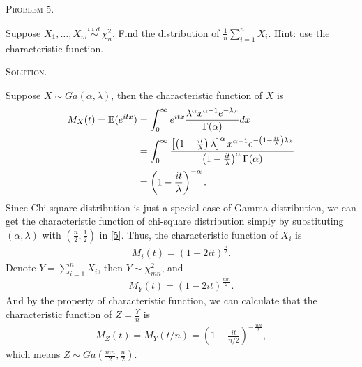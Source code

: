 \documentclass{article}
\begin{document}
\begin{CJK}{UTF8}{gbsn}
    \begin{shaded}
        \noindent\textsc{Problem 5.}\par
        Suppose $X_1,\ldots,X_m \mathop{\sim}\limits^{i.i.d.} \chi_n^2$. Find the distribution of $\frac{1}{n}\sum_{i=1}^nX_i $. Hint: use
        the characteristic function.
    \end{shaded}
    \noindent\textsc{Solution.}\par
    Suppose $X\sim Ga(\alpha, \lambda)$, then the characteristic function of $X$ is
    \begin{align}
        M_X(t) = \mathbb{E}(e^{itx}) & = \int_0^{\infty} e^{itx}\frac{\lambda^{\alpha}x^{\alpha -1}e^{-\lambda x}}{\Gamma(\alpha)}dx\notag                                                                                                                           \\
                                     & = \int_0^{\infty} \frac{\left [ \left (1-\frac{it}{\lambda}\right )\lambda\right ]^{\alpha}x^{\alpha -1}e^{-\left (1-\frac{it}{\lambda}\right )\lambda x}}{\left (1-\frac{it}{\lambda}\right )^{\alpha}\Gamma(\alpha)} \notag \\
                                     & = \left (1-\frac{it}{\lambda}\right )^{-\alpha}. \label{5}
    \end{align}
    Since Chi-square distribution is just a special case of Gamma distribution, we can get the characteristic function
    of chi-square distribution simply by substituting $(\alpha, \lambda)$ with $(\frac{n}{2}, \frac{1}{2})$ in \eqref{5}.
    Thus, the characteristic function of $X_i$ is
    \begin{align}
        M_i(t) = (1-2it)^{\frac{n}{2}}.
    \end{align}
    Denote $Y=\sum_{i=1}^n X_i$, then $Y\sim \chi^2_{mn}$, and
    \begin{align}
        M_Y(t) = (1-2it)^{\frac{mn}{2}}.
    \end{align}
    And by the property of characteristic function, we can calculate that the characteristic function of $Z=\frac{Y}{n}$ is
    \begin{align}
        M_Z(t) = M_Y(t/n) = \left (1-\frac{it}{n/2} \right )^{-\frac{mn}{2}},
    \end{align}
    which means $Z\sim Ga\left (\frac{mn}{2}, \frac{n}{2}\right )$.

\end{CJK}
\end{document}
